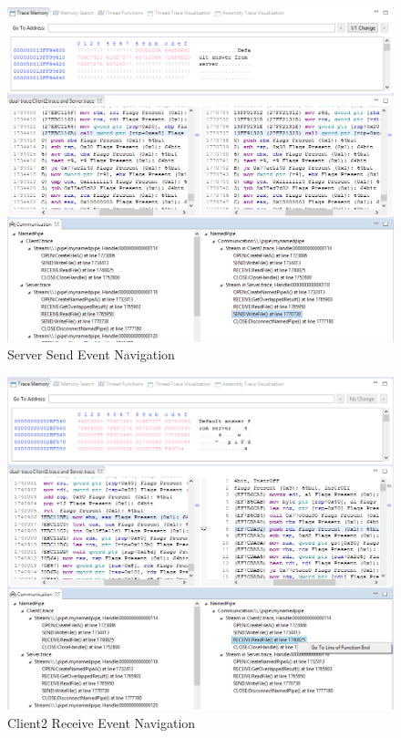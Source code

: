 \begin{figure}[H]
\centerline{\includegraphics[scale=0.4]{Figures/result22_server_send}}
 \caption{Server Send Event Navigation}
\label{result22_server_send}
\end{figure}


\begin{figure}[H]
\centerline{\includegraphics[scale=0.4]{Figures/result22_client_read}}
 \caption{Client2 Receive Event Navigation}
\label{result22_client_read}
\end{figure}

